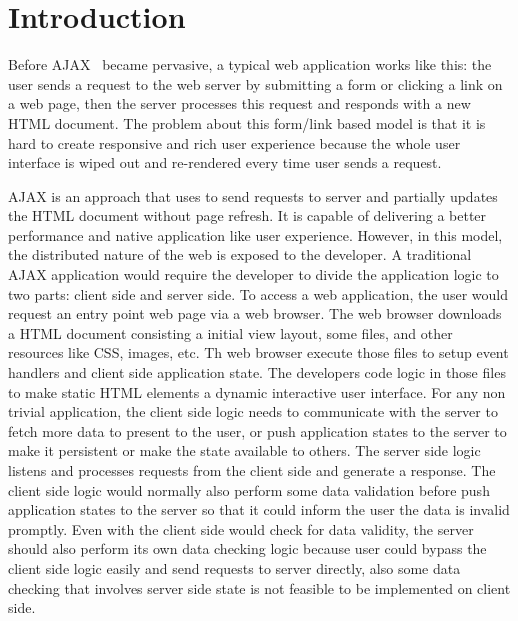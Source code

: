 \section{Introduction}
\label{sec:intro}

Before AJAX~\cite{garrett2005ajax} became pervasive, a typical web application works like this:
the user sends a request to the web server by submitting a form or clicking a link on a web page,
then the server processes this request and responds with a new HTML document.
The problem about this form/link based model is that it is hard
to create responsive and rich user experience because the whole user interface
is wiped out and re-rendered every time user sends a request.

AJAX is an approach that uses \js{} to send requests to server
and partially updates the HTML document without page refresh.
It is capable of delivering a better performance and native application like user experience.
However, in this model, the distributed nature of the web is exposed to the developer.
A traditional AJAX application would require the developer to divide the application logic to two parts:
client side and server side.
To access a web application, the user would request an entry point web page via a web browser.
The web browser downloads a HTML document consisting a initial view layout,
 some \js{} files, and other resources like CSS, images, etc.
Th web browser execute those \js{} files to setup event handlers and client side application state.
The developers code logic in those \js{} files to make static
HTML elements a dynamic interactive user interface.
For any non trivial application,
the client side logic needs to communicate with the server to fetch more data
to present to the user,
or push application states to the server to make it persistent
or make the state available to others.
The server side logic listens and processes requests from the client side
and generate a response.
The client side logic would normally also perform some data validation before push
application states to the server so that it could inform the user the data
is invalid promptly.
Even with the client side would check for data validity,
the server should also perform its own data checking logic
because user could bypass the client side logic easily and send requests to server directly,
also some data checking that involves server side state is not feasible to be implemented on client side.

